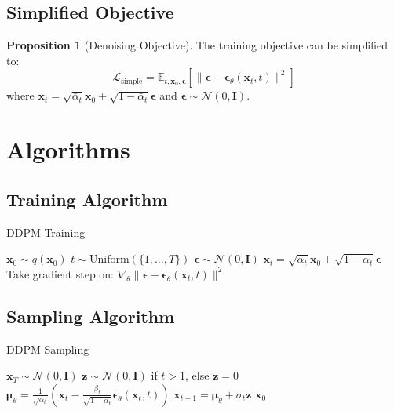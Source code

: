 \documentclass[11pt,a4paper]{article}
\theoremstyle{definition}
\newtheorem{proposition}[theorem]{Proposition}
\newcommand{\E}{\mathbb{E}}
\newcommand{\N}{\mathcal{N}}
\begin{document}
\subsection{Simplified Objective}

\begin{proposition}[Denoising Objective]
    The training objective can be simplified to:
    \begin{equation}
        \mathcal{L}_{\text{simple}} = \E_{t,\mathbf{x}_0,\bm{\epsilon}}\left[\|\bm{\epsilon} - \bm{\epsilon}_\theta(\mathbf{x}_t, t)\|^2\right]
        \label{eq:simple_loss}
    \end{equation}
    where $\mathbf{x}_t = \sqrt{\bar{\alpha}_t}\mathbf{x}_0 + \sqrt{1-\bar{\alpha}_t}\bm{\epsilon}$ and $\bm{\epsilon} \sim \N(0, \mathbf{I})$.
\end{proposition}

\section{Algorithms}

\subsection{Training Algorithm}

\begin{algorithm}[H]
\caption{DDPM Training}
\label{alg:ddpm_train}
\begin{algorithmic}[1]
\Repeat
    \State $\mathbf{x}_0 \sim q(\mathbf{x}_0)$ 
    \State $t \sim \text{Uniform}(\{1, \ldots, T\})$ 
    \State $\bm{\epsilon} \sim \N(0, \mathbf{I})$ 
    \State $\mathbf{x}_t = \sqrt{\bar{\alpha}_t}\mathbf{x}_0 + \sqrt{1-\bar{\alpha}_t}\bm{\epsilon}$ 
    \State Take gradient step on:
    \State \quad $\nabla_\theta \|\bm{\epsilon} - \bm{\epsilon}_\theta(\mathbf{x}_t, t)\|^2$
\end{algorithmic}
\end{algorithm}

\subsection{Sampling Algorithm}

\begin{algorithm}[H]
\caption{DDPM Sampling}
\label{alg:ddpm_sample}
\begin{algorithmic}[1]
\State $\mathbf{x}_T \sim \N(0, \mathbf{I})$
    \State $\mathbf{z} \sim \N(0, \mathbf{I})$ if $t > 1$, else $\mathbf{z} = 0$
    \State $\bm{\mu}_\theta = \frac{1}{\sqrt{\alpha_t}}\left(\mathbf{x}_t - \frac{\beta_t}{\sqrt{1-\bar{\alpha}_t}}\bm{\epsilon}_\theta(\mathbf{x}_t, t)\right)$
    \State $\mathbf{x}_{t-1} = \bm{\mu}_\theta + \sigma_t\mathbf{z}$
\EndFor
\State \Return $\mathbf{x}_0$
\end{algorithmic}
\end{algorithm}
\end{document}
